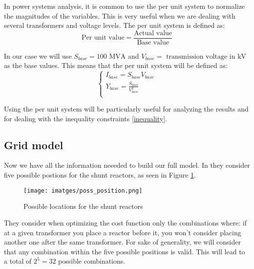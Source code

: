 \documentclass[a4paper,11pt, titlepage, twoside]{article}
\begin{document}
In power systems analysis, it is common to use the per unit system to normalize the magnitudes of the variables. This is very useful when we are dealing with several transformers and voltage levels. 
The per unit system is defined as:
\begin{equation}
    \text{Per unit value} = \frac{\text{Actual value}}{\text{Base value}}
\end{equation}

In our case we will use $S_{base} =100 \text{ MVA}$ and $V_{base} = \text{ transmission voltage in kV}$ as the base values. This means that the per unit system will be defined as:
\begin{equation}
    \begin{cases}
        I_{base} = S_{base}V_{base} \\
        Y_{base} = \frac{S_{base}}{V_{base}^2} \\
    \end{cases}
\end{equation}

Using the per unit system will be particularly useful for analyzing the results and for dealing with the inequality constraints \ref{inequality}.

\subsection{Grid model}

Now we have all the information neeeded to build our full model. In \cite{paperbase} they consider five possible postions for the shunt reactors, as seen in Figure \ref{fig:poss_position}. 
\begin{figure}[H]
    \centering
	\texttt{[image: imatges/poss\_position.png]}
	\caption{Possible locations for the shunt reactors \cite{paperbase}}
    \label{fig:poss_position}
\end{figure}



They consider when optimizing the cost function only the combinations where: if at a given transformer you place a reactor before it, you won't consider placing another one
after the same transformer. For sake of generality, we will consider that any combination within the five possible positions is valid. This will lead to a total of $2^5 = 32$ possible combinations.
\end{document}
